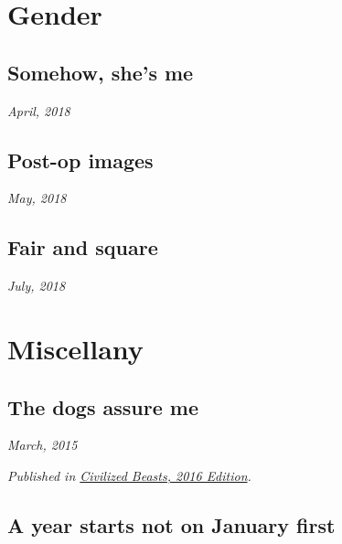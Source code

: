 \documentclass[11pt]{memoir}
\begin{document}
    \chapter{Gender}

    \newpage

    \section*{Somehow, she's me}

    \hfill\textit{April, 2018}

    
    \newpage


    \section*{Post-op images}

    \hfill\textit{May, 2018}

    
    \newpage


    \section*{Fair and square}

    \hfill\textit{July, 2018}

    
    \cleartoverso


    \chapter{Miscellany}
    \thispagestyle{empty}
    \newpage


    \section*{The dogs assure me}

    \hfill\textit{March, 2015}

    

    \textit{Published in \underline{Civilized Beasts, 2016 Edition}.}
    \newpage


    \section*{A year starts not on January first}
\end{document}
